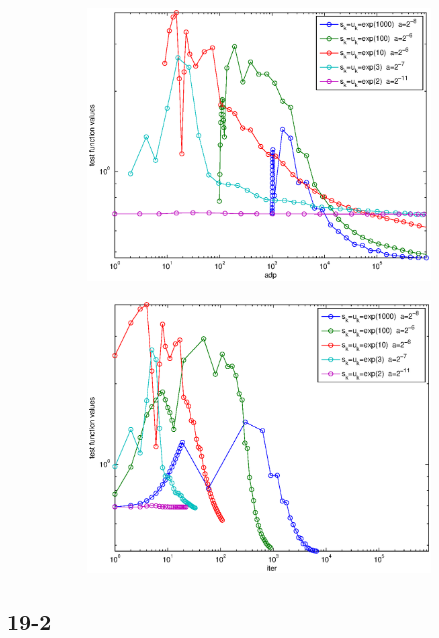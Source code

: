 \documentclass[12pt]{article}
\begin{document}
	\begin{figure}[H]
	\begin{subfigure}[b]{.5\linewidth}
		        \includegraphics[width=4in]{GenFigures/19-1-1.eps}
	\end{subfigure}%
	\begin{subfigure}[b]{.5\linewidth}
		        \includegraphics[width=4in]{GenFigures/19-1-2.eps}
	\end{subfigure}%

	\end{figure}
	
	\subsection{19-2}
\end{document}
